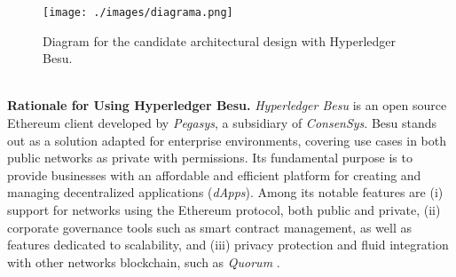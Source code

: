 \begin{figure}[hbt]
  \centering
  \texttt{[image: ./images/diagrama.png]}
  \caption{Diagram for the candidate architectural design with Hyperledger Besu.}
  \label{fig:diagrama}
\end{figure}

\\
\noindent\textbf{Rationale for Using Hyperledger Besu.} \textit{Hyperledger Besu} is an open source Ethereum client developed by \textit{Pegasys}, a subsidiary of \textit{ConsenSys}. Besu stands out as a solution adapted for enterprise environments, covering use cases in both public networks as private with permissions. Its fundamental purpose is to provide businesses with an affordable and efficient platform for creating and managing decentralized applications (\textit{dApps}). Among its notable features are (i) support for networks using the Ethereum protocol, both public and private, (ii) corporate governance tools such as smart contract management, as well as features dedicated to scalability, and (iii) privacy protection and fluid integration with other networks blockchain, such as \textit{Quorum} \cite{Dalla2021}.

